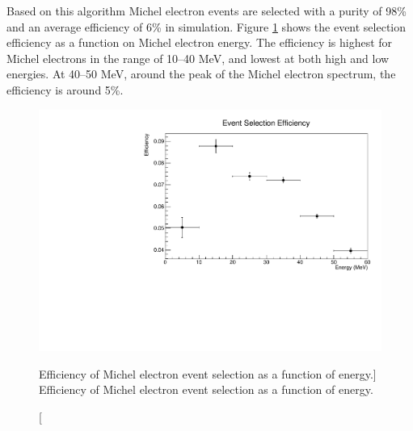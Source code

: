 Based on this algorithm Michel electron events are selected with a
purity of 98\% and an average efficiency of 6\% in \protodune{} simulation. 
Figure \ref{fig:ev_sel_eff} shows the event selection efficiency as a 
function on Michel electron energy. The efficiency is highest for Michel
electrons in the range of 10--40 MeV, and lowest at both high and low 
energies. At 40--50 MeV, around the peak of the Michel electron spectrum, the 
efficiency is around 5\%.
\begin{figure}
	\centering
	\includegraphics[width=\textwidth, height=0.68\textwidth]{figures/eff_v_energy.pdf}
	\caption
	[Efficiency of Michel electron event selection as a function of energy.]
	{Efficiency of Michel electron event selection as a function of energy.}
	\label{fig:ev_sel_eff}
\end{figure}


